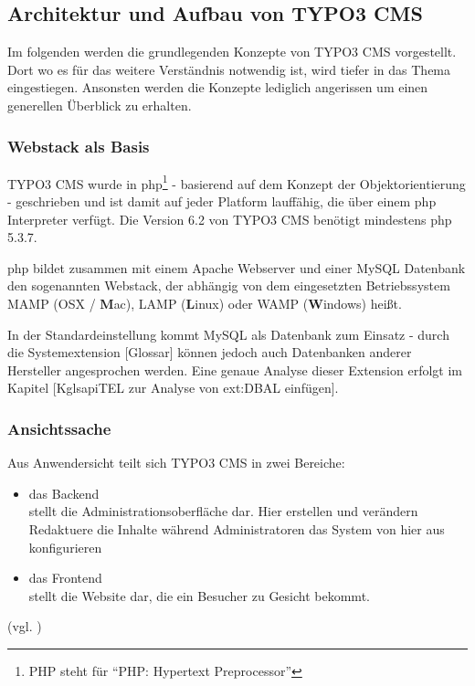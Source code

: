 \subsection{Architektur und Aufbau von TYPO3 CMS}
\label{subsec:architectureTypo3}
Im folgenden werden die grundlegenden Konzepte von TYPO3 CMS vorgestellt. Dort wo es für das weitere Verständnis notwendig ist, wird tiefer in das Thema eingestiegen. Ansonsten werden die Konzepte lediglich angerissen um einen generellen Überblick zu erhalten.

\subsubsection{Webstack als Basis}

TYPO3 CMS wurde in \gls{php}\footnote{PHP steht für ``PHP: Hypertext Preprocessor''} - basierend auf dem Konzept der Objektorientierung - geschrieben und ist damit auf jeder Platform lauffähig, die über einem \gls{php} Interpreter verfügt. Die Version 6.2 von TYPO3 CMS benötigt mindestens \gls{php} 5.3.7.

\gls{php} bildet zusammen mit einem Apache Webserver und einer MySQL Datenbank den sogenannten Webstack, der abhängig von dem eingesetzten Betriebssystem MAMP (OSX / {\bfseries M}ac), LAMP ({\bfseries L}inux) oder WAMP ({\bfseries W}indows) heißt.

In der Standardeinstellung kommt MySQL als Datenbank zum Einsatz - durch die Systemextension [Glossar] können jedoch auch Datenbanken anderer Hersteller angesprochen werden. Eine genaue Analyse dieser Extension erfolgt im Kapitel [Kgls{api}TEL zur Analyse von ext:DBAL einfügen].

\subsubsection{Ansichtssache}
Aus Anwendersicht teilt sich TYPO3 CMS in zwei Bereiche:

\begin{itemize}
	\item das Backend\\
		stellt die Administrationsoberfläche dar. Hier erstellen und verändern Redaktuere die Inhalte während Administratoren das System von hier aus konfigurieren
	\item das Frontend\\
		stellt die Website dar, die ein Besucher zu Gesicht bekommt.
\end{itemize}
(vgl. \cite[S. 5]{book:dulepovTypo32008})

